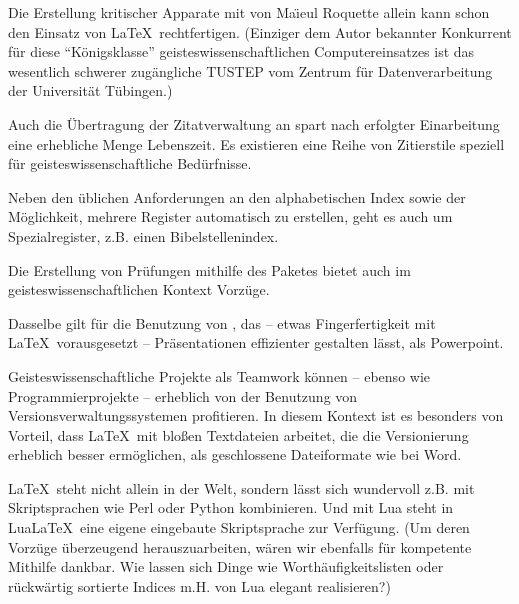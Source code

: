 \documentclass[ngerman]{dtk}
\begin{document}

Die Erstellung kritischer Apparate mit  von Ma\"{\i}eul Roquette allein kann schon den
Einsatz von \LaTeX\ rechtfertigen. (Einziger dem Autor bekannter Konkurrent für diese \enquote{Königsklasse} 
geisteswissenschaftlichen Computereinsatzes ist das wesentlich schwerer
zugängliche TUSTEP vom Zentrum für Datenverarbeitung der Universität Tübingen.)


Auch die Übertragung der Zitatverwaltung an  spart nach erfolgter Einarbeitung eine erhebliche
Menge Lebenszeit. Es existieren eine Reihe von Zitierstile speziell für geisteswissenschaftliche Bedürfnisse.


Neben den üblichen Anforderungen an den alphabetischen Index sowie der Möglichkeit, mehrere Register
automatisch zu erstellen, geht es auch um Spezialregister, z.B. einen Bibelstellenindex.


Die Erstellung von Prüfungen mithilfe des Paketes  bietet auch im geisteswissenschaftlichen
Kontext Vorzüge.


Dasselbe gilt für die Benutzung von , das -- etwas Fingerfertigkeit mit \LaTeX\ vorausgesetzt --
Präsentationen effizienter gestalten lässt, als Powerpoint.


Geisteswissenschaftliche Projekte als Teamwork können -- ebenso wie Programmierprojekte -- erheblich von
der Benutzung von Versionsverwaltungssystemen profitieren.
In diesem Kontext ist es besonders von Vorteil, dass \LaTeX\ mit bloßen Textdateien arbeitet, die die
Versionierung erheblich besser ermöglichen, als geschlossene Dateiformate wie bei Word.


\LaTeX\ steht nicht allein in der Welt, sondern lässt sich wundervoll z.B. mit Skriptsprachen wie Perl oder
Python kombinieren. Und mit Lua steht in Lua\LaTeX\ eine eigene eingebaute Skriptsprache zur Verfügung.
(Um deren Vorzüge überzeugend herauszuarbeiten, wären wir ebenfalls für kompetente Mithilfe dankbar.
Wie lassen sich Dinge wie Worthäufigkeitslisten oder rückwärtig sortierte Indices m.H. von Lua elegant
realisieren?)
\end{document}
